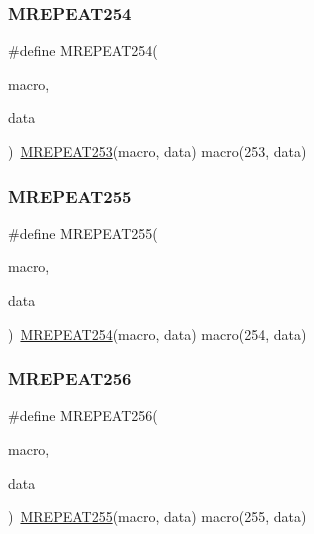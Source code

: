 \mbox{\label{group__group__sam0__utils__mrepeat_gaf3e63914581123ee4c557b0c3b98003b}} 
\subsubsection{\texorpdfstring{MREPEAT254}{MREPEAT254}}
{\footnotesize\ttfamily \#define M\+R\+E\+P\+E\+A\+T254(\begin{DoxyParamCaption}\item[{}]{macro,  }\item[{}]{data }\end{DoxyParamCaption})~\mbox{\hyperlink{group__group__sam0__utils__mrepeat_gafbbb5e11ca1e4ca9c893de68c868a4cb}{M\+R\+E\+P\+E\+A\+T253}}(macro, data)   macro(253, data)}

\mbox{\label{group__group__sam0__utils__mrepeat_ga9db19e5893568dfa7130030f09a45eba}} 
\subsubsection{\texorpdfstring{MREPEAT255}{MREPEAT255}}
{\footnotesize\ttfamily \#define M\+R\+E\+P\+E\+A\+T255(\begin{DoxyParamCaption}\item[{}]{macro,  }\item[{}]{data }\end{DoxyParamCaption})~\mbox{\hyperlink{group__group__sam0__utils__mrepeat_gaf3e63914581123ee4c557b0c3b98003b}{M\+R\+E\+P\+E\+A\+T254}}(macro, data)   macro(254, data)}

\mbox{\label{group__group__sam0__utils__mrepeat_gaa49bde8a3b34d9a86caf1c0397d5993f}} 
\subsubsection{\texorpdfstring{MREPEAT256}{MREPEAT256}}
{\footnotesize\ttfamily \#define M\+R\+E\+P\+E\+A\+T256(\begin{DoxyParamCaption}\item[{}]{macro,  }\item[{}]{data }\end{DoxyParamCaption})~\mbox{\hyperlink{group__group__sam0__utils__mrepeat_ga9db19e5893568dfa7130030f09a45eba}{M\+R\+E\+P\+E\+A\+T255}}(macro, data)   macro(255, data)}

